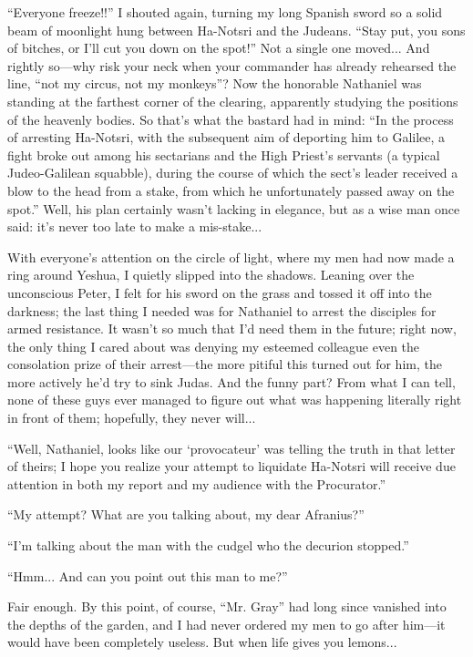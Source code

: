 ``Everyone freeze!!'' I shouted again, turning my long Spanish sword so a solid beam of moonlight hung between Ha-Notsri and the Judeans. ``Stay put, you sons of bitches, or I'll cut you down on the spot!'' Not a single one moved... And rightly so---why risk your neck when your commander has already rehearsed the line, ``not my circus, not my monkeys''? Now the honorable Nathaniel was standing at the farthest corner of the clearing, apparently studying the positions of the heavenly bodies. So that's what the bastard had in mind: ``In the process of arresting Ha-Notsri, with the subsequent aim of deporting him to Galilee, a fight broke out among his sectarians and the High Priest's servants (a typical Judeo-Galilean squabble), during the course of which the sect's leader received a blow to the head from a stake, from which he unfortunately passed away on the spot.'' Well, his plan certainly wasn't lacking in elegance, but as a wise man once said: it's never too late to make a mis-stake...

With everyone's attention on the circle of light, where my men had now made a ring around Yeshua, I quietly slipped into the shadows. Leaning over the unconscious Peter, I felt for his sword on the grass and tossed it off into the darkness; the last thing I needed was for Nathaniel to arrest the disciples for armed resistance. It wasn't so much that I'd need them in the future; right now, the only thing I cared about was denying my esteemed colleague even the consolation prize of their arrest---the more pitiful this turned out for him, the more actively he'd try to sink Judas. And the funny part? From what I can tell, none of these guys ever managed to figure out what was happening literally right in front of them; hopefully, they never will...

``Well, Nathaniel, looks like our `provocateur' was telling the truth in that letter of theirs; I hope you realize your attempt to liquidate Ha-Notsri will receive due attention in both my report and my audience with the Procurator.''

``My attempt? What are you talking about, my dear Afranius?''

``I'm talking about the man with the cudgel who the decurion stopped.''

``Hmm... And can you point out this man to me?''

Fair enough. By this point, of course, ``Mr. Gray'' had long since vanished into the depths of the garden, and I had never ordered my men to go after him---it would have been completely useless. But when life gives you lemons...

